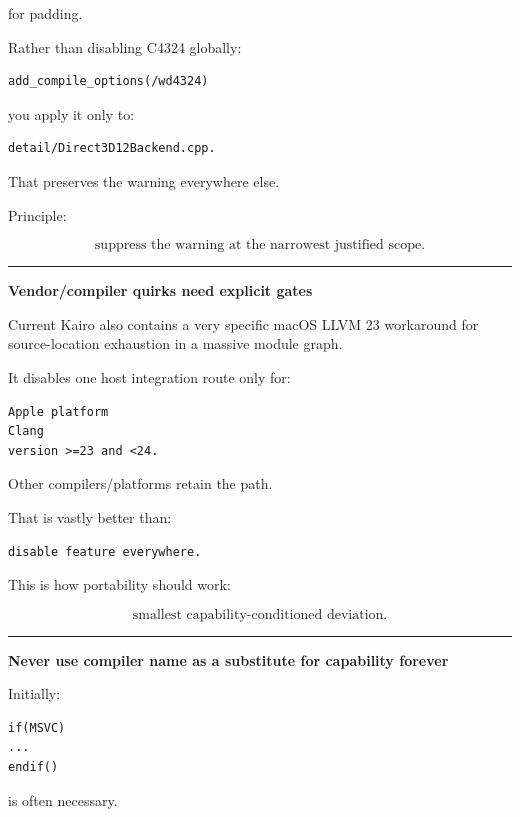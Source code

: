 for padding.

Rather than disabling C4324 globally:

\begin{verbatim}
add_compile_options(/wd4324)
\end{verbatim}

you apply it only to:

\begin{verbatim}
detail/Direct3D12Backend.cpp.
\end{verbatim}

That preserves the warning everywhere else.

Principle:

\[
\boxed{
\text{suppress the warning at the narrowest justified scope}.
}
\]

\begin{center}\rule{0.5\linewidth}{0.5pt}\end{center}

\textbf{Vendor/compiler quirks need explicit gates}

Current Kairo also contains a very specific macOS LLVM 23 workaround for source-location exhaustion in a massive module graph.

It disables one host integration route only for:

\begin{verbatim}
Apple platform
Clang
version >=23 and <24.
\end{verbatim}

Other compilers/platforms retain the path.

That is vastly better than:

\begin{verbatim}
disable feature everywhere.
\end{verbatim}

This is how portability should work:

\[
\text{smallest capability-conditioned deviation}.
\]

\begin{center}\rule{0.5\linewidth}{0.5pt}\end{center}

\textbf{Never use compiler name as a substitute for capability forever}

Initially:

\begin{verbatim}
if(MSVC)
...
endif()
\end{verbatim}

is often necessary.


